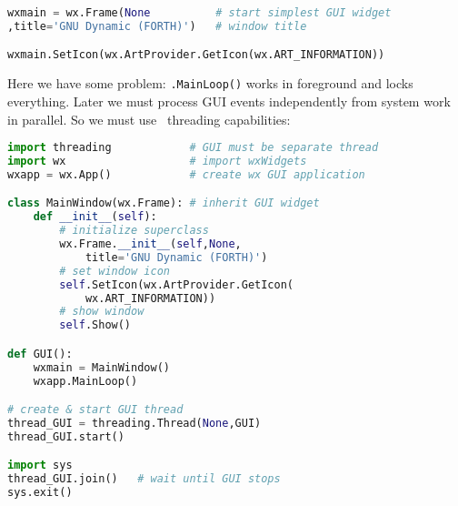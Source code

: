 \begin{lstlisting}[language=python]
wxmain = wx.Frame(None			# start simplest GUI widget
,title='GNU Dynamic (FORTH)')	# window title

wxmain.SetIcon(wx.ArtProvider.GetIcon(wx.ART_INFORMATION))
\end{lstlisting}
Here we have some problem: \verb|.MainLoop()| works in foreground and locks
everything. Later we must process GUI events independently from system work
in parallel. So we must use \py\ threading capabilities:
\begin{lstlisting}[language=python]
import threading			# GUI must be separate thread
import wx					# import wxWidgets
wxapp = wx.App()			# create wx GUI application

class MainWindow(wx.Frame):	# inherit GUI widget
	def __init__(self):
		# initialize superclass
		wx.Frame.__init__(self,None,
			title='GNU Dynamic (FORTH)')
		# set window icon
		self.SetIcon(wx.ArtProvider.GetIcon(
			wx.ART_INFORMATION))
		# show window
		self.Show()

def GUI():
	wxmain = MainWindow()
	wxapp.MainLoop()

# create & start GUI thread
thread_GUI = threading.Thread(None,GUI)
thread_GUI.start()

import sys
thread_GUI.join()	# wait until GUI stops
sys.exit()
\end{lstlisting}

